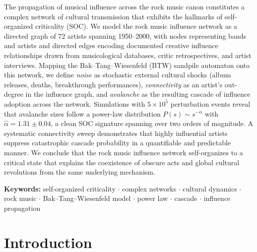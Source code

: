 \documentclass[12pt, a4paper]{article}
\begin{document}
\begin{titlepage}
\begin{center}
  \vspace{1.2cm}
  \begin{tcolorbox}[colback=white, colframe=rockgold!80!black,
      width=0.92\linewidth, arc=4pt, boxrule=1.2pt,
      title={\bfseries Abstract}, fonttitle=\normalsize]
  \small\setlength{\parskip}{4pt}
  The propagation of musical influence across the rock music
  canon constitutes a complex network of cultural transmission
  that exhibits the hallmarks of self-organized criticality (SOC).
  We model the rock music influence network as a directed graph
  of 72 artists spanning 1950--2000, with nodes representing bands
  and artists and directed edges encoding documented creative
  influence relationships drawn from musicological databases,
  critic retrospectives, and artist interviews.
  Mapping the Bak--Tang--Wiesenfeld (BTW) sandpile automaton onto
  this network, we define \textit{noise} as stochastic external
  cultural shocks (album releases, deaths, breakthrough performances),
  \textit{connectivity} as an artist's out-degree in the influence
  graph, and \textit{avalanche} as the resulting cascade of
  influence adoption across the network.
  Simulations with $5\times10^5$ perturbation events reveal that
  avalanche sizes follow a power-law distribution
  $P(s)\sim s^{-\alpha}$ with $\hat{\alpha}=1.31\pm0.04$,
  a clean SOC signature spanning over two orders of magnitude.
  A systematic connectivity sweep demonstrates that highly
  influential artists suppress catastrophic cascade probability
  in a quantifiable and predictable manner.
  We conclude that the rock music influence network self-organizes
  to a critical state that explains the coexistence of obscure
  acts and global cultural revolutions from the same underlying
  mechanism.

  \smallskip
  \textbf{Keywords:} self-organized criticality $\cdot$ complex
  networks $\cdot$ cultural dynamics $\cdot$ rock music $\cdot$
  Bak--Tang--Wiesenfeld model $\cdot$ power law $\cdot$
  cascade $\cdot$ influence propagation
  \end{tcolorbox}
\end{center}
\end{titlepage}

\newpage
\tableofcontents
\newpage


\section{Introduction}
\end{document}
